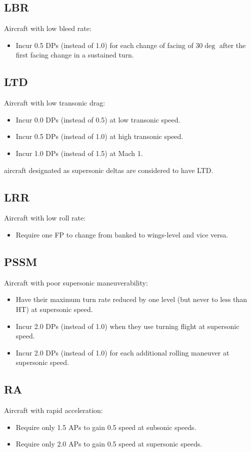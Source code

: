\documentclass[10pt]{extarticle}
\begin{document}
\subsection{LBR} Aircraft with low bleed rate:
\begin{itemize}
    \item Incur 0.5 DPs (instead of 1.0) for each change of facing of $30\deg$ after the first facing change in a sustained turn.
\end{itemize}

\subsection{LTD} Aircraft with low transonic drag:
\begin{itemize}
    \item Incur 0.0 DPs (instead of 0.5) at low transonic speed.
    \item Incur 0.5 DPs (instead of 1.0) at high transonic speed.
    \item Incur 1.0 DPs (instead of 1.5) at Mach 1.
\end{itemize}
{\AS} aircraft designated as supersonic deltas are considered to have LTD.

\subsection{LRR} Aircraft with low roll rate:
\begin{itemize}
    \item Require one FP to change from banked to wings-level and vice versa.
\end{itemize}

\subsection{PSSM} Aircraft with poor supersonic maneuverability:
\begin{itemize}
    \item Have their maximum turn rate reduced by one level (but never to less than HT) at supersonic speed.
    \item Incur 2.0 DPs (instead of 1.0) when they use turning flight at supersonic speed.
    \item Incur 2.0 DPs (instead of 1.0) for each additional rolling maneuver at supersonic speed.
\end{itemize}

\subsection{RA} Aircraft with rapid acceleration:
\begin{itemize}
    \item Require only 1.5 APs to gain 0.5 speed at subsonic speeds.
    \item Require only 2.0 APs to gain 0.5 speed at supersonic speeds.
\end{itemize}
\end{document}

